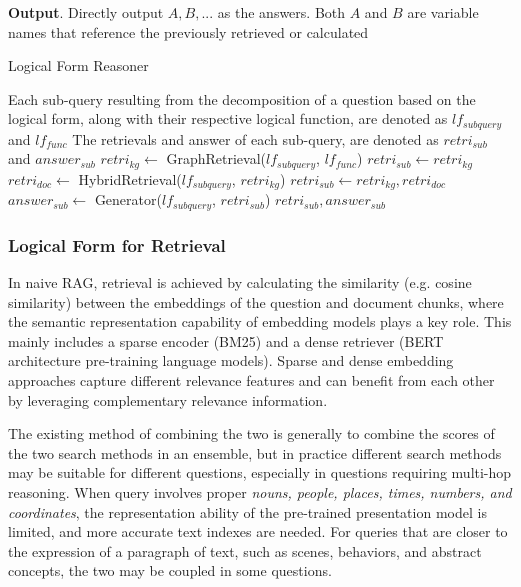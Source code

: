 \documentclass{article}
\begin{document}
\textbf{Output}. Directly output $A, B, ...$ as the answers. Both $A$ and $B$ are variable names that reference the previously retrieved or calculated
\begin{algorithm*}[htbp]
\caption{Logical Form Reasoner}
\begin{algorithmic}[2]
\Require Each sub-query resulting from the decomposition of a question based on the logical form, along with their respective logical function, are denoted as $lf_{subquery}$ and $lf_{func}$
\Ensure The retrievals and answer of each sub-query, are denoted as $retri_{sub}$ and $answer_{sub}$
\State $retri_{kg} \gets$ GraphRetrieval($lf_{subquery}$, $lf_{func}$)
    \State $retri_{sub} \gets retri_{kg}$
\Else{}
    \State $retri_{doc} \gets$ HybridRetrieval($lf_{subquery}$, $retri_{kg}$)
    \State $retri_{sub} \gets retri_{kg}, retri_{doc}$  
\EndIf
\State $answer_{sub} \gets$ Generator($lf_{subquery}$, $retri_{sub}$)
\State \Return $retri_{sub}, answer_{sub}$
\label{alg:logic_form_reasoner}
\end{algorithmic}
\end{algorithm*}

\subsubsection{Logical Form for Retrieval}
In naive RAG, retrieval is achieved by calculating the similarity (e.g. cosine similarity) between the embeddings of the question and document chunks, where the semantic representation capability of embedding models plays a key role. This mainly includes a sparse encoder (BM25) and a dense retriever (BERT architecture pre-training language models). 
Sparse and dense embedding approaches capture different relevance features and can benefit from each other by leveraging complementary relevance information.

The existing method of combining the two is generally to combine the scores of the two search methods in an ensemble, but in practice different search methods may be suitable for different questions, especially in questions requiring multi-hop reasoning. When query involves proper \textit{nouns, people, places, times, numbers, and coordinates}, the representation ability of the pre-trained presentation model is limited, and more accurate text indexes are needed. For queries that are closer to the expression of a paragraph of text, such as scenes, behaviors, and abstract concepts, the two may be coupled in some questions. 
\end{document}
